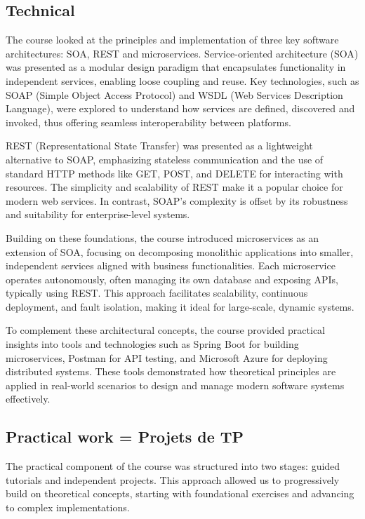 \subsection{Technical}
\indent \indent The course looked at the principles and implementation of three key software architectures: SOA, REST and microservices.
Service-oriented architecture (SOA) was presented as a modular design paradigm that encapsulates functionality in independent services, enabling loose coupling and reuse.
Key technologies, such as SOAP (Simple Object Access Protocol) and WSDL (Web Services Description Language), were explored to understand how services are defined, discovered and invoked, thus offering seamless interoperability between platforms.

REST (Representational State Transfer) was presented as a lightweight alternative to SOAP, emphasizing stateless communication and the use of standard HTTP methods like GET, POST, and DELETE for interacting with resources. 
The simplicity and scalability of REST make it a popular choice for modern web services. 
In contrast, SOAP's complexity is offset by its robustness and suitability for enterprise-level systems.

Building on these foundations, the course introduced microservices as an extension of SOA, focusing on decomposing monolithic applications into smaller, independent services aligned with business functionalities. 
Each microservice operates autonomously, often managing its own database and exposing APIs, typically using REST. This approach facilitates scalability, continuous deployment, and fault isolation, making it ideal for large-scale, dynamic systems.

To complement these architectural concepts, the course provided practical insights into tools and technologies such as Spring Boot for building microservices, Postman for API testing, and Microsoft Azure for deploying distributed systems. 
These tools demonstrated how theoretical principles are applied in real-world scenarios to design and manage modern software systems effectively.

\subsection{Practical work = Projets de TP}
The practical component of the course was structured into two stages: guided tutorials and independent projects. This approach allowed us to progressively build on theoretical concepts, starting with foundational exercises and advancing to complex implementations.
\\
